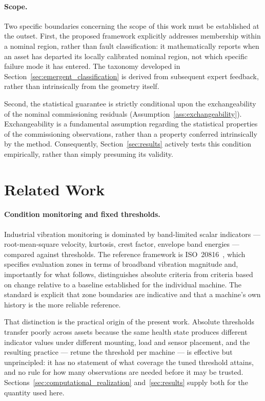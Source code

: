 \documentclass[a4paper]{cas-sc}
\begin{document}
\paragraph{Scope.}
Two specific boundaries concerning the scope of this work must be established at the outset. First, the proposed framework explicitly addresses membership within a nominal region, rather than fault classification: it mathematically reports when an asset has departed its locally calibrated nominal region, not which specific failure mode it has entered. The taxonomy developed in Section~\ref{sec:emergent_classification} is derived from subsequent expert feedback, rather than intrinsically from the geometry itself.

Second, the statistical guarantee is strictly conditional upon the exchangeability of the nominal commissioning residuals (Assumption~\ref{ass:exchangeability}). Exchangeability is a fundamental assumption regarding the statistical properties of the commissioning observations, rather than a property conferred intrinsically by the method. Consequently, Section~\ref{sec:results} actively tests this condition empirically, rather than simply presuming its validity.

\section{Related Work}
\label{sec:related}


\paragraph{Condition monitoring and fixed thresholds.}
Industrial vibration monitoring is dominated by band-limited scalar
indicators --- root-mean-square velocity, kurtosis, crest factor, envelope
band energies --- compared against thresholds. The reference framework is
\mbox{ISO~20816}~\citep{iso20816}, which specifies evaluation zones in terms of broadband
vibration magnitude and, importantly for what follows, distinguishes absolute
criteria from criteria based on change relative to a baseline established for
the individual machine. The standard is explicit that zone boundaries are
indicative and that a machine's own history is the more reliable reference.

That distinction is the practical origin of the present work. Absolute
thresholds transfer poorly across assets because the same health state
produces different indicator values under different mounting, load and sensor
placement, and the resulting practice --- retune the threshold per machine ---
is effective but unprincipled: it has no statement of what coverage the tuned
threshold attains, and no rule for how many observations are needed before it
may be trusted. Sections~\ref{sec:computational_realization}
and~\ref{sec:results} supply both for the quantity used here.
\end{document}
